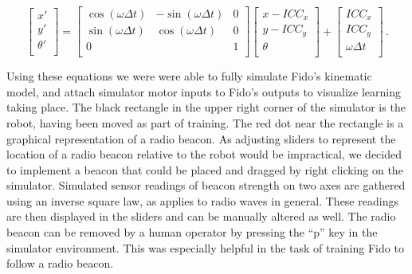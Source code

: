 \begin{equation}
	\begin{bmatrix}
	    x'      \\
	    y'      \\
	    \theta' \\
	\end{bmatrix} =
	\begin{bmatrix}
		\cos(\omega\Delta t) & -\sin(\omega\Delta t) & 0 \\
		\sin(\omega\Delta t) & \cos(\omega\Delta t)  & 0 \\
		0                    &                       & 1 \\
	\end{bmatrix}
	\begin{bmatrix}
		x - ICC_x  \\
		y - ICC_y  \\
		\theta     \\
	\end{bmatrix} + 
	\begin{bmatrix}
		ICC_x          \\
		ICC_y          \\
		\omega\Delta t \\
	\end{bmatrix} \,.
\end{equation}

Using these equations we were were able to fully simulate Fido's kinematic model, and attach simulator motor inputs to Fido's outputs to visualize learning taking place.   
The black rectangle in the upper right corner of the simulator is the robot, having been moved as part of training.  The red dot near the rectangle is a graphical representation of a radio beacon.  As adjusting sliders to represent the location of a radio beacon relative to the robot would be impractical, we decided to implement a beacon that could be placed and dragged by right clicking on the simulator.  Simulated sensor readings of beacon strength on two axes are gathered using an inverse square law, as applies to radio waves in general.  These readings are then displayed in the sliders and can be manually altered as well.  The radio beacon can be removed by a human operator by pressing the ``p'' key in the simulator environment.  This was especially helpful in the task of training Fido to follow a radio beacon.
